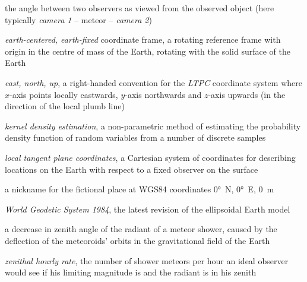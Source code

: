 \begin{description}[labelindent=0mm, leftmargin=40mm]
    \item[convergence angle]
        the angle between two observers as viewed from the observed object (here typically \emph{camera 1} -- meteor -- \emph{camera 2})
    \item[ECEF]
        \emph{earth-centered, earth-fixed} coordinate frame, a rotating reference frame with origin
        in the centre of mass of the Earth, rotating with the solid surface of the Earth
    \item[ENU]
        \emph{east, north, up}, a right-handed convention for the \emph{LTPC} coordinate system where
        $x$-axis points locally eastwards, $y$-axis northwards and $z$-axis upwards
        (in the direction of the local plumb line)
    \item[KDE]
        \emph{kernel density estimation}, a non-parametric method of estimating the probability density function
        of random variables from a number of discrete samples
    \item[LTPC]
        \emph{local tangent plane coordinates}, a Cartesian system of coordinates
        for describing locations on the Earth with respect to a fixed observer on the surface
    \item[Null Island]
        a nickname for the fictional place at WGS84 coordinates \ang{0}~N, \ang{0}~E, \SI{0}{\metre} \citep{null-island}
    \item[WGS84]
        \emph{World Geodetic System 1984}, the latest revision of the ellipsoidal Earth model \citep{nima-wgs84}
    \item[zenith attraction]
        a decrease in zenith angle of the radiant of a meteor shower, caused by the deflection of the meteoroids' orbits in the
        gravitational field of the Earth \citep{lovell1954}
    \item[ZHR]
        \emph{zenithal hourly rate}, the number of shower meteors per hour an ideal observer would see
            if his limiting magnitude is  and the radiant is in his zenith \citep{imo-glossary}
\end{description}
